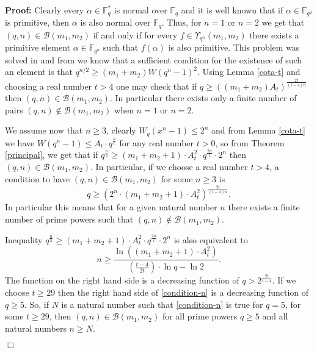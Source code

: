 \documentclass[12pt]{article}
\newenvironment{proof}{\noindent \textbf{Proof: }}{\hfill
$\Box$  \vspace{1ex}}
\newcommand{\F}{\mathbb{F}}
\def\Bb {\mathcal{B}}
\begin{document}
\begin{proof}
Clearly every $\alpha \in \F_q^*$ is  
	normal over
	$\F_q$ and it is well known that  if $\alpha \in \F_{q^2}$ is 
	primitive, then
	$\alpha$ is also normal over $\F_q$. Thus, for $n=1$ or $n=2$ we get that
	$(q,n)\in \Bb(m_1,m_2)$ if and only if
	for every $f \in \Upsilon_{q^n} (m_1,m_2)$
	there exists a primitive element $\alpha \in \F_{q^n}$ such that 
	$f(\alpha)$ is
	also primitive. This problem was solved in \cite{CSS} and from \cite[Thm. 
	3.1]{CSS} we know that a sufficient condition for the existence of 
	such an element is that
	$q^{n/2} \geq (m_1 + m_2) W(q^n-1)^2$. Using Lemma \ref{cota-t}
	and choosing a real number $t>4$
	one may check that if $q \geq \left( 
	(m_1+m_2)A_t\right)^{\frac{2t}{(t-4)n}}$
	then $(q,n)\in \Bb(m_1,m_2)$. In particular there exists only a finite 
	number of pairs
	$(q,n) \notin \Bb(m_1,m_2)$ when $n=1$ or $n=2$.
	
	We assume now that $n \geq 3$, 
	clearly $W_q(x^n-1) \leq 2^n$ and from Lemma \ref{cota-t}
	we have $W(q^n-1) \leq A_t \cdot q^{\frac{n}{t}}$ for any real number $t 
	>0$, so  
	from Theorem \ref{principal}, we get that if 
	$q^{\frac{n}{2}} \geq (m_1+m_2+1)\cdot A_t^2 \cdot q^{\frac{2n}{t}} \cdot 
	2^n$
	then $(q,n)\in \Bb(m_1,m_2)$.
	In particular, if we choose a real number $t>4$, 
	a condition to have $(q,n)\in \Bb(m_1,m_2)$
	for some $n \geq 3$ is
	\begin{equation}\label{condition-q}
		q \geq 
		\left(
		2^n \cdot (m_1+m_2+1)\cdot A_t^2
		\right)^{\frac{2t}{(t-4)n}}.
	\end{equation}
	In particular this means that for a given natural number $n$ there exists a 
	finite number of prime
	powers such that $(q,n)\notin \Bb(m_1,m_2)$.
	
	Inequality $q^{\frac{n}{2}} \geq (m_1+m_2+1)\cdot A_t^2 \cdot 
	q^{\frac{2n}{t}} \cdot 2^n$
	is also equivalent to
	\begin{equation}\label{condition-n}
		n \geq
		\frac{\ln \left( (m_1+m_2+1)\cdot A_t^2 \right)}%
		{(\frac{t-4}{2t}) \cdot  \ln q - \ln 2} .
	\end{equation}
	The function on the right hand side is a decreasing function of $q > 
	2^{\frac{2t}{t-4}}$.
	If we choose $t\geq 29$ then the right hand side of \eqref{condition-n}
	is a decreasing function of $q \geq 5$.
	So, if
	$N$ is a natural number such that \eqref{condition-n} is true for $q=5$,
	for some $t\geq 29$, then
	$(q,n)\in \Bb(m_1,m_2)$ for all prime powers $q\geq 5$ and all
	natural numbers
	$n \geq N$.
	

\end{proof}
\end{document}
